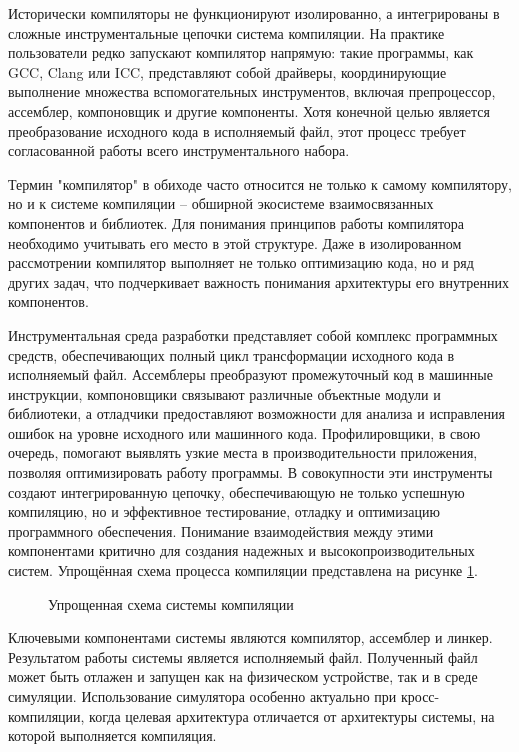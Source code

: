 Исторически компиляторы не функционируют изолированно, а интегрированы в сложные инструментальные цепочки система компиляции. На практике пользователи редко запускают компилятор напрямую: такие программы, как GCC, Clang или ICC, представляют собой драйверы, координирующие выполнение множества вспомогательных инструментов, включая препроцессор, ассемблер, компоновщик и другие компоненты. Хотя конечной целью является преобразование исходного кода в исполняемый файл, этот процесс требует согласованной работы всего инструментального набора.

Термин "компилятор" в обиходе часто относится не только к самому компилятору, но и к системе компиляции -- обширной экосистеме взаимосвязанных компонентов и библиотек. Для понимания принципов работы компилятора необходимо учитывать его место в этой структуре. Даже в изолированном рассмотрении компилятор выполняет не только оптимизацию кода, но и ряд других задач, что подчеркивает важность понимания архитектуры его внутренних компонентов.

Инструментальная среда разработки представляет собой комплекс программных средств, обеспечивающих полный цикл трансформации исходного кода в исполняемый файл. Ассемблеры преобразуют промежуточный код в машинные инструкции, компоновщики связывают различные объектные модули и библиотеки, а отладчики предоставляют возможности для анализа и исправления ошибок на уровне исходного или машинного кода. Профилировщики, в свою очередь, помогают выявлять узкие места в производительности приложения, позволяя оптимизировать работу программы. В совокупности эти инструменты создают интегрированную цепочку, обеспечивающую не только успешную компиляцию, но и эффективное тестирование, отладку и оптимизацию программного обеспечения. Понимание взаимодействия между этими компонентами критично для создания надежных и высокопроизводительных систем.
Упрощённая схема процесса компиляции представлена на рисунке \ref{fig:tulchain}.

\begin{figure}[H]
	\centering
	\caption{Упрощенная схема системы компиляции}
	\label{fig:tulchain}
\end{figure}

 Ключевыми компонентами системы являются компилятор, ассемблер и линкер. Результатом работы системы является исполняемый файл. Полученный файл может быть отлажен и запущен как на физическом устройстве, так и в среде симуляции. Использование симулятора особенно актуально при кросс-компиляции, когда целевая архитектура отличается от архитектуры системы, на которой выполняется компиляция.

